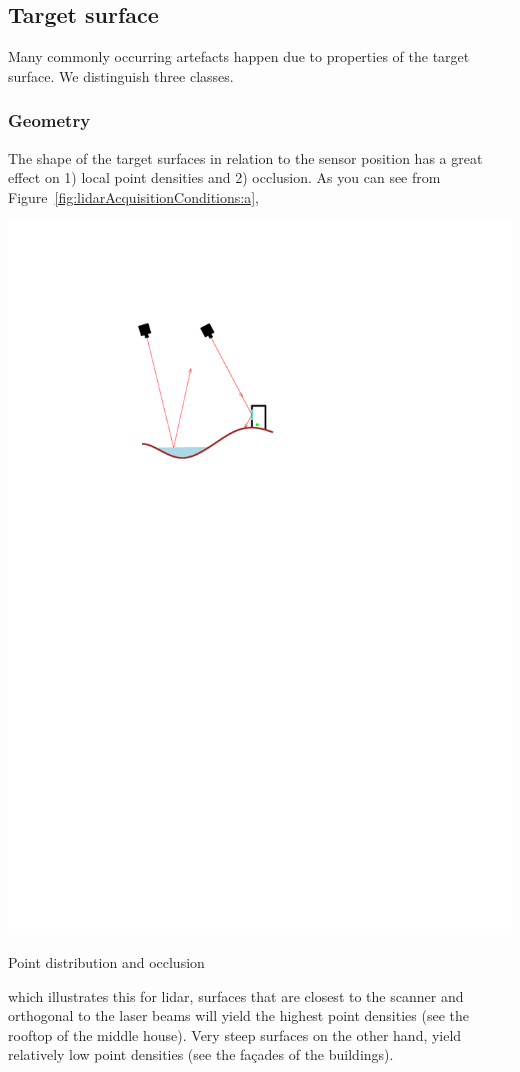 \subsection{Target surface}
Many commonly occurring  artefacts  happen due to properties of the target surface. We distinguish three classes.

\subsubsection{Geometry} 
The shape of the target surfaces in relation to the sensor position has a great effect on 1) local point densities and 2) occlusion. As you can see from Figure~\ref{fig:lidarAcquisitionConditions:a},
\begin{marginfigure}
	\centering
	\includegraphics[width=\textwidth,page=2]{figs/lidarAcq.pdf}
	\caption{Point distribution and occlusion}%
	\label{fig:lidarAcquisitionConditions:a}
\end{marginfigure}
which illustrates this for lidar, surfaces that are closest to the scanner and orthogonal to the laser beams will yield the highest point densities (see the rooftop of the middle house). Very steep surfaces on the other hand, yield relatively low point densities (see the façades of the buildings). 

